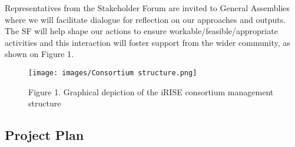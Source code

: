 \documentclass[
]{article}
\begin{document}
Representatives from the Stakeholder Forum are invited to General
Assemblies where we will facilitate dialogue for reflection on our
approaches and outputs. The SF will help shape our actions to ensure
workable/feasible/appropriate activities and this interaction will
foster support from the wider community, as shown on Figure 1.

\begin{figure}
\centering
\texttt{[image: images/Consortium structure.png]}
\caption{Figure 1. Graphical depiction of the iRISE consortium management
structure}
\end{figure}

\hypertarget{project-plan}{%
\subsection{Project Plan}\label{project-plan}}
\end{document}
